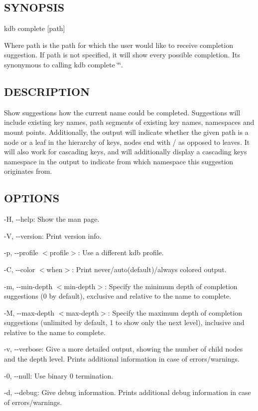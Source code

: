 \subsection*{S\+Y\+N\+O\+P\+S\+IS}

{\ttfamily kdb complete \mbox{[}path\mbox{]}}

Where {\ttfamily path} is the path for which the user would like to receive completion suggestion. If {\ttfamily path} is not specified, it will show every possible completion. Its synonymous to calling {\ttfamily kdb complete \char`\"{}\char`\"{}}.

\subsection*{D\+E\+S\+C\+R\+I\+P\+T\+I\+ON}

Show suggestions how the current name could be completed. Suggestions will include existing key names, path segments of existing key names, namespaces and mount points. Additionally, the output will indicate whether the given path is a node or a leaf in the hierarchy of keys, nodes end with \textquotesingle{}/\textquotesingle{} as opposed to leaves. It will also work for cascading keys, and will additionally display a cascading key\textquotesingle{}s namespace in the output to indicate from which namespace this suggestion originates from.

\subsection*{O\+P\+T\+I\+O\+NS}


\begin{DoxyItemize}
\item {\ttfamily -\/H}, {\ttfamily -\/-\/help}\+: Show the man page.
\item {\ttfamily -\/V}, {\ttfamily -\/-\/version}\+: Print version info.
\item {\ttfamily -\/p}, {\ttfamily -\/-\/profile $<$profile$>$}\+: Use a different kdb profile.
\item {\ttfamily -\/C}, {\ttfamily -\/-\/color $<$when$>$}\+: Print never/auto(default)/always colored output.
\item {\ttfamily -\/m}, {\ttfamily -\/-\/min-\/depth $<$min-\/depth$>$}\+: Specify the minimum depth of completion suggestions (0 by default), exclusive and relative to the name to complete.
\item {\ttfamily -\/M}, {\ttfamily -\/-\/max-\/depth $<$max-\/depth$>$}\+: Specify the maximum depth of completion suggestions (unlimited by default, 1 to show only the next level), inclusive and relative to the name to complete.
\item {\ttfamily -\/v}, {\ttfamily -\/-\/verbose}\+: Give a more detailed output, showing the number of child nodes and the depth level. Prints additional information in case of errors/warnings.
\item {\ttfamily -\/0}, {\ttfamily -\/-\/null}\+: Use binary 0 termination.
\item {\ttfamily -\/d}, {\ttfamily -\/-\/debug}\+: Give debug information. Prints additional debug information in case of errors/warnings.
\end{DoxyItemize}

